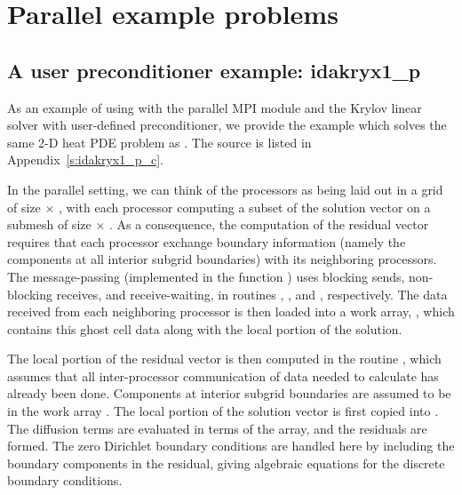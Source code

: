 \section{Parallel example problems}\label{s:ex_parallel}

\subsection{A user preconditioner example: idakryx1\_p}\label{ss:idakryx1_p}

As an example of using {\ida} with the parallel MPI {\nvecp} module and the Krylov 
linear solver {\idaspgmr} with user-defined preconditioner, we provide the example
 which solves the same 2-D heat PDE problem as . 
The source is listed in Appendix~\ref{s:idakryx1_p_c}.

In the parallel setting, we can think of the processors as being laid out
in a grid of size  $\times$ , with each processor computing
a subset of the solution vector on a submesh of size  $\times$
.  As a consequence, the computation of the residual
vector requires that each processor exchange boundary information
(namely the components at all interior subgrid boundaries) with its
neighboring processors.  The message-passing (implemented in the
function ) uses blocking sends, non-blocking receives, and
receive-waiting, in routines , , and
, respectively.  The data received from each neighboring
processor is then loaded into a work array, , which contains
this ghost cell data along with the local portion of the solution.

The local portion of the residual vector is then computed in the
routine , which assumes that all inter-processor
communication of data needed to calculate  has already been
done.  Components at interior subgrid boundaries are assumed to be in
the work array .  The local portion of the solution vector
 is first copied into .  The diffusion terms are
evaluated in terms of the  array, and the residuals are
formed.  The zero Dirichlet boundary conditions are handled here by
including the boundary components in the residual, giving algebraic
equations for the discrete boundary conditions.

